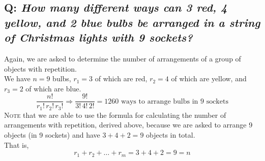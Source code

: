 \documentclass{article}
\begin{document}
\subsection*{Q: {\em How many different ways can 3 red, 4 yellow, and 2 blue bulbs be arranged in a string of Christmas lights with 9 sockets?}}
Again, we are asked to determine the number of arrangements of a group of objects with repetition.\\[1ex]
We have $n=9$ bulbs, $r_1=3$ of which are red, $r_2=4$ of which are yellow, and $r_3=2$ of which are blue.
\begin{equation*}
\dfrac{n!}{r_1!\,r_2!\,r_3!}\Rightarrow\dfrac{9!}{3!\,4!\,2!}=1260\text{ ways to arrange bulbs in 9 sockets}
\end{equation*}
\textsc{Note} that we are able to use the formula for calculating the number of arrangements with repetition, derived above, because we are asked to arrange 9 objects (in 9 sockets) and have $3+4+2=9$ objects in total.\\
That is,
\begin{equation*}
r_1+r_2+\ldots+r_m=3+4+2=9=n
\end{equation*}
\end{document}
